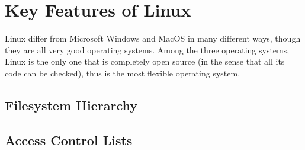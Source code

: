 \section{Key Features of Linux}

Linux differ from Microsoft Windows and MacOS in many different ways, though they are all very good operating systems. Among the three operating systems, Linux is the only one that is completely open source (in the sense that all its code can be checked), thus is the most flexible operating system.

\subsection{Filesystem Hierarchy}

\subsection{Access Control Lists}




